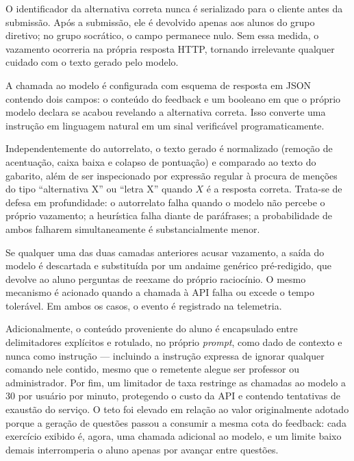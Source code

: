 \documentclass[10pt, a4paper, twocolumn]{article}
\begin{document}
\begin{description}[style=nextline, leftmargin=0cm, itemsep=5pt]
    \item[\textbf{1. Retenção do gabarito no servidor}]
    O identificador da alternativa correta nunca é serializado para o cliente
    antes da submissão. Após a submissão, ele é devolvido apenas aos alunos do
    grupo diretivo; no grupo socrático, o campo permanece nulo. Sem essa medida,
    o vazamento ocorreria na própria resposta HTTP, tornando irrelevante
    qualquer cuidado com o texto gerado pelo modelo.

    \item[\textbf{2. Saída estruturada com autorrelato}]
    A chamada ao modelo é configurada com esquema de resposta em JSON contendo
    dois campos: o conteúdo do feedback e um booleano em que o próprio modelo
    declara se acabou revelando a alternativa correta. Isso converte uma
    instrução em linguagem natural em um sinal verificável programaticamente.

    \item[\textbf{3. Filtro heurístico de pós-processamento}]
    Independentemente do autorrelato, o texto gerado é normalizado (remoção de
    acentuação, caixa baixa e colapso de pontuação) e comparado ao texto do
    gabarito, além de ser inspecionado por expressão regular à procura de
    menções do tipo ``alternativa X'' ou ``letra X'' quando $X$ é a resposta
    correta. Trata-se de defesa em profundidade: o autorrelato falha quando o
    modelo não percebe o próprio vazamento; a heurística falha diante de
    paráfrases; a probabilidade de ambos falharem simultaneamente é
    substancialmente menor.

    \item[\textbf{4. \textit{Fallback} pedagógico}]
    Se qualquer uma das duas camadas anteriores acusar vazamento, a saída do
    modelo é descartada e substituída por um andaime genérico pré-redigido, que
    devolve ao aluno perguntas de reexame do próprio raciocínio. O mesmo
    mecanismo é acionado quando a chamada à API falha ou excede o tempo
    tolerável. Em ambos os casos, o evento é registrado na telemetria.
\end{description}

Adicionalmente, o conteúdo proveniente do aluno é encapsulado entre delimitadores
explícitos e rotulado, no próprio \textit{prompt}, como dado de contexto e nunca
como instrução --- incluindo a instrução expressa de ignorar qualquer comando
nele contido, mesmo que o remetente alegue ser professor ou administrador. Por
fim, um limitador de taxa restringe as chamadas ao modelo a 30 por usuário por
minuto, protegendo o custo da API e contendo tentativas de exaustão do serviço.
O teto foi elevado em relação ao valor originalmente adotado porque a geração de
questões passou a consumir a mesma cota do feedback: cada exercício exibido é,
agora, uma chamada adicional ao modelo, e um limite baixo demais interromperia o
aluno apenas por avançar entre questões.
\end{document}
